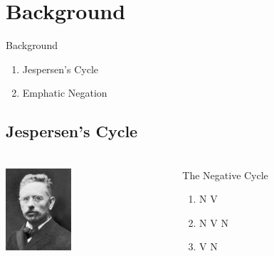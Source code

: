 \documentclass[compress]{beamer}
\begin{document}
 
\section[Background]{Background}


\begin{frame}{Background}
      \begin{enumerate}
           \item Jespersen's Cycle
	   \item Emphatic Negation
      \end{enumerate}
\end{frame}

\subsection{Jespersen's Cycle}

\begin{frame}
\frametitle{\cite{jespersen:1917}}
\begin{columns}[T]  
   \begin{column}{.25\textwidth}
	  \includegraphics[height=1.2in]{jespersen.jpg}   
   \end{column}
   \begin{column}{.7\textwidth}
      \begin{block}{The Negative Cycle}
	\begin{enumerate}
	     \item N V
	     \item N V N
	     \item V N
	\end{enumerate}
      \end{block}
    \end{column}
  \end{columns}
\end{frame}
\end{document}
